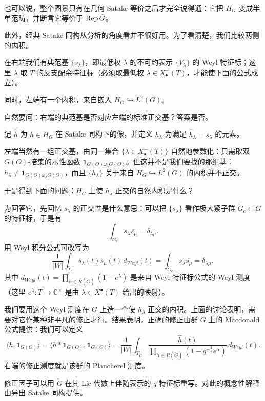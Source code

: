 也可以说，整个图景只有在几何 Satake 等价之后才完全说得通：它把 $H_G$ 变成半单范畴，并断言它等价于 $\operatorname{Rep}\check G$。

此外，经典 Satake 同构从分析的角度看并不很好用。为了看清楚，我们比较两侧的内积。

在右端我们有典范基 $\{s_\lambda\}$，即最低权 $\lambda$ 的不可约表示 $\{V_\lambda\}$ 的 Weyl 特征标；这里 $\lambda$ 取 $T$ 的反支配余特征标（必须取最低权 $\lambda\in X^-_\bullet(T)$，才能使下面的公式成立）。

同时，左端有一个内积，来自嵌入 $H_G\hookrightarrow L^2(G)$。

自然要问：右端的典范基是否对应左端的标准正交基？答案是否。

记 $\hat h$ 为 $h\in H_G$ 在 Satake 同构下的像，并定义 $h_\lambda$ 为满足 $\hat h_\lambda=s_\lambda$ 的元素。

左端当然有一组正交基，由同一集合 $\{\lambda\in X^-_\bullet(T)\}$ 自然地参数化：只需取双 $G(O)$-陪集的示性函数 $\mathbf 1_{G(O)\omega_\lambda G(O)}$。但这并不是我们要找的那组基：$h_\lambda\neq\mathbf 1_{G(O)\omega_\lambda G(O)}$，而且 $\{h_\lambda\}$ 关于来自 $H_G\hookrightarrow L^2(G)$ 的内积并不正交。

于是得到下面的问题：$H_G$ 上使 $h_\lambda$ 正交的自然内积是什么？

为回答它，先回忆 $s_\lambda$ 的正交性是什么意思：可以把 $\{s_\lambda\}$ 看作极大紧子群 $\check G_c\subset G$ 的特征标，于是有
\[
  \int_{\check G_c}s_\lambda\overline{s_\mu}=\delta_{\lambda\mu}.
\]
用 Weyl 积分公式可改写为
\begin{equation}
  \frac{1}{|W|}\int_{\check T_c}s_\lambda(t)\overline{s_\mu(t)}\,d_{Weyl}(t)
  =\int_{\check G_c}s_\lambda\overline{s_\mu}=\delta_{\lambda\mu},
  \label{eq:5-20}
\end{equation}
其中 $d_{Weyl}(t)=\prod_{\check\alpha\in R(\check G)}(1-e^\lambda)$ 是来自 Weyl 特征标公式的 Weyl 测度（这里 $e^\lambda:T\to\mathbb C^\times$ 是由 $\lambda\in X^\bullet(T)$ 给出的映射）。

我们要用这个 Weyl 测度在 $G$ 上造一个使 $h_\lambda$ 正交的内积。上面的讨论表明，需要对它作某种非平凡的修正才行。结果表明，正确的修正由群 $G$ 上的 Macdonald 公式提供：我们可以定义
\begin{equation}
  \langle h,\mathbf 1_{G(O)}\rangle=\langle h*\mathbf 1_{G(O)},\mathbf 1_{G(O)}\rangle
  =\frac{1}{|W|}\int_{T_{\check G}}\frac{\hat h(t)}{\prod_{\check\alpha\in R(\check G)}(1-q^{-\frac12}e^{\check\alpha})}\,d_{Weyl}(t).
  \label{eq:5-21}
\end{equation}
右端的修正测度就是该群的 Plancherel 测度。

修正因子可以用 $\check G$ 在其 Lie 代数上伴随表示的 $q$-特征标重写。对此的概念性解释由导出 Satake 同构提供。
